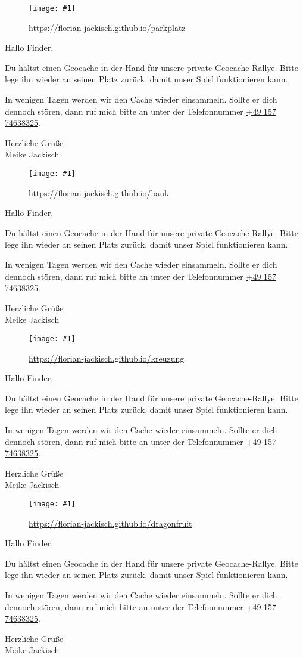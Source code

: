 \documentclass[a4paper,oneside]{article}
\newcommand{\myQRCodes}[2]{
        \begin{minipage}[t][7cm][b]{7cm}
        \begin{figure}[H]
            \centering
            \texttt{[image: \#1]}
            \caption*{\url{#2}}
        \end{figure}
        \end{minipage}
}
\newcommand{\explanation}{
        \setlength{\skip0}{\parskip}
        \begin{minipage}[t][7cm][c]{7cm}
        \setlength\parskip{\skip0}
Hallo Finder,

Du hältst einen Geocache in der Hand für unsere private Geocache-Rallye.
Bitte lege ihn wieder an seinen Platz zurück, damit unser Spiel funktionieren kann.

In wenigen Tagen werden wir den Cache wieder einsammeln.
Sollte er dich dennoch stören, dann ruf mich bitte an unter der Telefonnummer \href{tel:+49 157 74638325}{+49 157 74638325}.

Herzliche Grüße\\
Meike Jackisch
        \end{minipage}
}
\begin{document}

\myQRCodes{parkplatz.png}{https://florian-jackisch.github.io/parkplatz}
\explanation

\myQRCodes{bank.png}{https://florian-jackisch.github.io/bank}
\explanation

\myQRCodes{kreuzung.png}{https://florian-jackisch.github.io/kreuzung}
\explanation

\myQRCodes{dragonfruit.png}{https://florian-jackisch.github.io/dragonfruit}
\explanation
\end{document}
